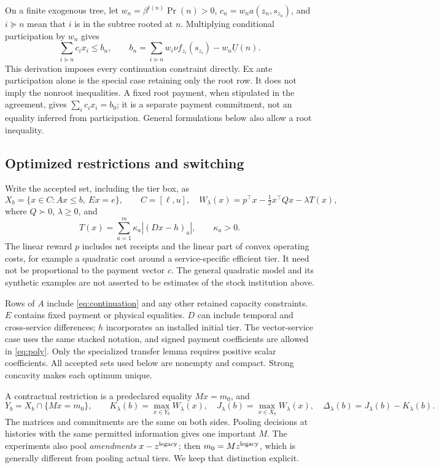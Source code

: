 \documentclass[11pt,letterpaper]{article}
\theoremstyle{definition}\newtheorem{assumption}[theorem]{Assumption}
\begin{document}
On a finite exogenous tree, let $w_n=\beta^{t(n)}\Pr(n)>0$, $c_n=w_na(z_n,s_{z_n})$, and $i\succeq n$ mean that $i$ is in the subtree rooted at $n$. Multiplying conditional participation by $w_n$ gives
\begin{equation}\label{eq:continuation}
 \sum_{i\succeq n}c_i x_i\leq b_n,\qquad
 b_n=\sum_{i\succeq n}w_i\nu f_{z_i}(s_{z_i})-w_n\underline U(n).
\end{equation}
This derivation imposes every continuation constraint directly. Ex ante participation alone is the special case retaining only the root row. It does not imply the nonroot inequalities. A fixed root payment, when stipulated in the agreement, gives $\sum_i c_i x_i=b_0$; it is a separate payment commitment, not an equality inferred from participation. General formulations below also allow a root inequality.

\subsection{Optimized restrictions and switching}
Write the accepted set, including the tier box, as
\begin{equation}\label{eq:poly}
 X_b=\{x\in C:Ax\leq b,\ Ex=e\},\qquad C=[\ell,u],
 \quad W_\lambda(x)=p^\top x-\tfrac12x^\top Qx-\lambda T(x),
\end{equation}
where $Q\succ0$, $\lambda\geq0$, and
\[
 T(x)=\sum_{a=1}^m\kappa_a|(Dx-h)_a|,\qquad \kappa_a>0.
\]
The linear reward $p$ includes net receipts and the linear part of convex operating costs, for example a quadratic cost around a service-specific efficient tier. It need not be proportional to the payment vector $c$. The general quadratic model and its synthetic examples are not asserted to be estimates of the stock institution above.

Rows of $A$ include \eqref{eq:continuation} and any other retained capacity constraints. $E$ contains fixed payment or physical equalities. $D$ can include temporal and cross-service differences; $h$ incorporates an installed initial tier. The vector-service case uses the same stacked notation, and signed payment coefficients are allowed in \eqref{eq:poly}. Only the specialized transfer lemma requires positive scalar coefficients. All accepted sets used below are nonempty and compact. Strong concavity makes each optimum unique.

A contractual restriction is a predeclared equality $Mx=m_0$, and
\begin{equation}\label{eq:values}
 Y_b=X_b\cap\{Mx=m_0\},\qquad
 K_\lambda(b)=\max_{x\in Y_b}W_\lambda(x),\quad
 J_\lambda(b)=\max_{x\in X_b}W_\lambda(x),\quad
 \Delta_\lambda(b)=J_\lambda(b)-K_\lambda(b).
\end{equation}
The matrices and commitments are the same on both sides. Pooling decisions at histories with the same permitted information gives one important $M$. The experiments also pool \emph{amendments} $x-z^{\rm legacy}$; then $m_0=Mz^{\rm legacy}$, which is generally different from pooling actual tiers. We keep that distinction explicit.
\end{document}
